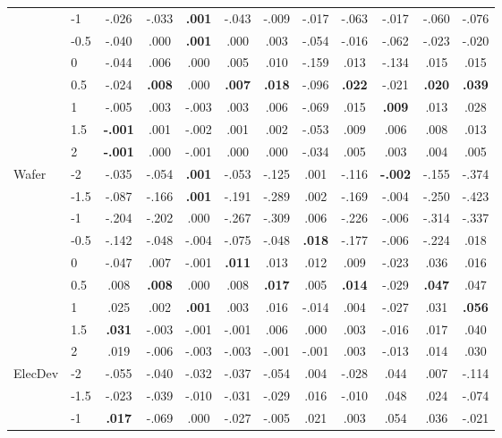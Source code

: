 \begin{table}[!htbp]
\begin{tabular*}{\textwidth}{@{\extracolsep{\fill}} llcccccccccc @{}}
 & -1 & -.026 & -.033 & \textbf{.001} & -.043 & -.009 & -.017 & -.063 & -.017 & -.060 & -.076 \\
 & -0.5 & -.040 & .000 & \textbf{.001} & .000 & .003 & -.054 & -.016 & -.062 & -.023 & -.020 \\
 & 0 & -.044 & .006 & .000 & .005 & .010 & -.159 & .013 & -.134 & .015 & .015 \\
 & 0.5 & -.024 & \textbf{.008} & .000 & \textbf{.007} & \textbf{.018} & -.096 & \textbf{.022} & -.021 & \textbf{.020} & \textbf{.039} \\
 & 1 & -.005 & .003 & -.003 & .003 & .006 & -.069 & .015 & \textbf{.009} & .013 & .028 \\
 & 1.5 & \textbf{-.001} & .001 & -.002 & .001 & .002 & -.053 & .009 & .006 & .008 & .013 \\
 & 2 & \textbf{-.001} & .000 & -.001 & .000 & .000 & -.034 & .005 & .003 & .004 & .005 \\
\cline{1-12}
\multirow[t]{7}{*}{Wafer} & -2 & -.035 & -.054 & \textbf{.001} & -.053 & -.125 & .001 & -.116 & \textbf{-.002} & -.155 & -.374 \\
 & -1.5 & -.087 & -.166 & \textbf{.001} & -.191 & -.289 & .002 & -.169 & -.004 & -.250 & -.423 \\
 & -1 & -.204 & -.202 & .000 & -.267 & -.309 & .006 & -.226 & -.006 & -.314 & -.337 \\
 & -0.5 & -.142 & -.048 & -.004 & -.075 & -.048 & \textbf{.018} & -.177 & -.006 & -.224 & .018 \\
 & 0 & -.047 & .007 & -.001 & \textbf{.011} & .013 & .012 & .009 & -.023 & .036 & .016 \\
 & 0.5 & .008 & \textbf{.008} & .000 & .008 & \textbf{.017} & .005 & \textbf{.014} & -.029 & \textbf{.047} & .047 \\
 & 1 & .025 & .002 & \textbf{.001} & .003 & .016 & -.014 & .004 & -.027 & .031 & \textbf{.056} \\
 & 1.5 & \textbf{.031} & -.003 & -.001 & -.001 & .006 & .000 & .003 & -.016 & .017 & .040 \\
 & 2 & .019 & -.006 & -.003 & -.003 & -.001 & -.001 & .003 & -.013 & .014 & .030 \\
\cline{1-12}
\multirow[t]{7}{*}{ElecDev} & -2 & -.055 & -.040 & -.032 & -.037 & -.054 & .004 & -.028 & .044 & .007 & -.114 \\
 & -1.5 & -.023 & -.039 & -.010 & -.031 & -.029 & .016 & -.010 & .048 & .024 & -.074 \\
 & -1 & \textbf{.017} & -.069 & .000 & -.027 & -.005 & .021 & .003 & .054 & .036 & -.021 \\

\end{tabular*}
\end{table}
